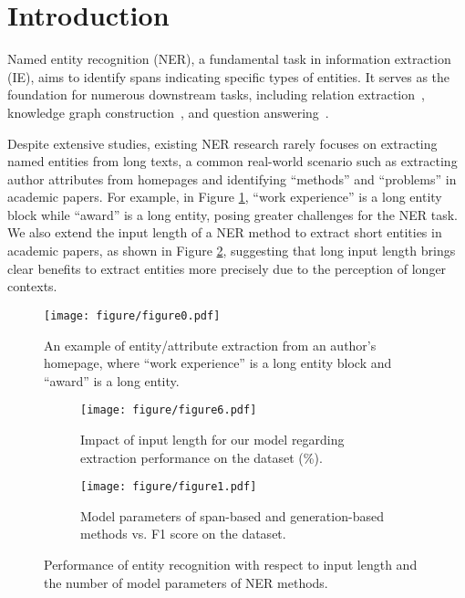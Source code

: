 \section{Introduction}

Named entity recognition (NER), a fundamental task in information extraction (IE), aims to identify spans indicating specific types of entities.
It serves as the foundation for numerous downstream tasks, including relation extraction~\cite{miwa2016end}, knowledge graph construction~\cite{xu2017cn}, and question answering~\cite{molla2006named}.

Despite extensive studies, existing NER research rarely focuses on extracting named entities from long texts, a common real-world scenario such as extracting author attributes from homepages and identifying ``methods'' and ``problems'' in academic papers.
For example, in Figure \ref{fig:data-example},
``work experience'' is a long entity block 
while ``award'' is a long entity,
posing greater challenges for the NER task.
We also extend 
the input length of a NER method to extract short entities in academic papers, as shown in 
Figure \ref{fig:length-analysis-scirex},
suggesting that long input length brings clear benefits to extract entities more precisely due to the perception of longer contexts.

\begin{figure}[t]
\centering
\texttt{[image: figure/figure0.pdf]} %
\caption{An example of entity/attribute extraction from an author's homepage,
where ``work experience'' is a long entity block
and ``award'' is a long entity.
}
\label{fig:data-example}
\end{figure}

\begin{figure*}[t]
	\begin{subfigure}{0.47\linewidth}
		\centering
		\texttt{[image: figure/figure6.pdf]}
		\caption{Impact of input length for our model \model regarding extraction performance on the \scirex dataset (\%).}
		\label{fig:length-analysis-scirex}
	\end{subfigure}
    \hspace{0.8cm}
    \begin{subfigure}{0.45\linewidth}
		\texttt{[image: figure/figure1.pdf]}
		\caption{Model parameters of span-based and generation-based methods vs. F1 score on the \profiling dataset.}
		\label{fig:para-vs-f1}
	\end{subfigure}
	\caption{Performance of entity recognition with respect to input length and the number of model parameters of NER methods.}
\end{figure*}

